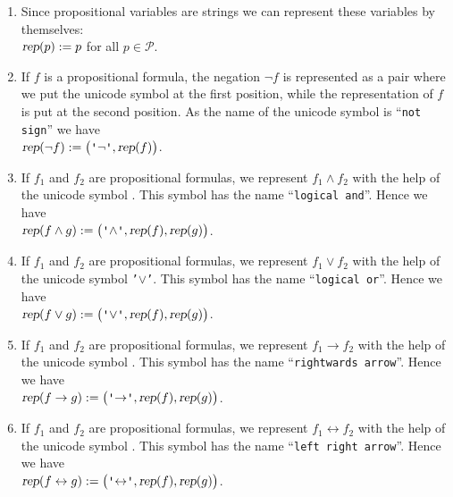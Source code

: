 \begin{enumerate}
      The unicode symbol \texttt{\tsq{$\falsum$}} has the name ``\texttt{down tack}''.
      Therefore, we have
      \\[0.2cm]
      \hspace*{1.3cm}
      $\textsl{rep}(\falsum) := \texttt{(\tsq{\symbol{92}N\{down tack\}},)}$.
\item Since propositional variables are strings we can represent these variables by themselves:
      \\[0.2cm]
      \hspace*{1.3cm}
      $\textsl{rep}(p) := p$ \quad for all $p \in \mathcal{P}$.
\item If $f$ is a propositional formula, the  negation $\neg f$ is represented as a pair where
      we put the unicode symbol \texttt{\tsq{$\neg$}} at the first position, while the representation of $f$ is put
      at the second position.  As the name of the unicode symbol \texttt{\tsq{$\neg$}} is
      ``\texttt{not sign}'' we have
      \\[0.2cm]
      \hspace*{1.3cm} 
      $\textsl{rep}(\neg f) := \bigl(\texttt{\tsq{$\neg$}}, \textsl{rep}(f)\bigr)$.
\item If $f_1$ and $f_2$ are propositional formulas, we represent $f_1 \wedge f_2$ with the help of the
      unicode symbol \texttt{\tsq{$\wedge$}}.  This symbol has the name ``\texttt{logical and}''.  Hence we have
      \\[0.2cm]
      \hspace*{1.3cm} 
      $\textsl{rep}(f \wedge g) := \bigl(\texttt{\tsq{$\wedge$}}, \textsl{rep}(f), \textsl{rep}(g)\bigr)$.
\item If $f_1$ and $f_2$ are propositional formulas, we represent $f_1 \vee f_2$ with the help of the unicode symbol
      \texttt{'$\vee$'}. This symbol has the name ``\texttt{logical or}''.  Hence we have
      \\[0.2cm]
      \hspace*{1.3cm} 
      $\textsl{rep}(f \vee g) := \bigl(\texttt{\tsq{$\vee$}}, \textsl{rep}(f), \textsl{rep}(g)\bigr)$.
\item If $f_1$ and $f_2$ are propositional formulas, we represent $f_1 \rightarrow f_2$ with the help of the
      unicode symbol \texttt{\tsq{$\rightarrow$}}.  This symbol has the name ``\texttt{rightwards arrow}''.
      Hence we have
      \\[0.2cm]
      \hspace*{1.3cm} 
      $\textsl{rep}(f \rightarrow g) := \bigl(\texttt{\tsq{$\rightarrow$}}, \textsl{rep}(f), \textsl{rep}(g)\bigr)$.
\item If $f_1$ and $f_2$ are propositional formulas, we represent $f_1 \leftrightarrow f_2$ with the help of
      the unicode symbol \texttt{\tsq{$\leftrightarrow$}}.  This symbol has the name ``\texttt{left right arrow}''.
      Hence we have
      \\[0.2cm]
      \hspace*{1.3cm} 
      $\textsl{rep}(f \leftrightarrow g) := \bigl(\texttt{\tsq{$\leftrightarrow$}}, \textsl{rep}(f), \textsl{rep}(g)\bigr)$.
\end{enumerate}
